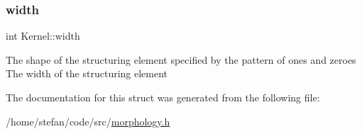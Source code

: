 \subsubsection{\texorpdfstring{width}{width}}
{\footnotesize\ttfamily int Kernel\+::width}

The shape of the structuring element specified by the pattern of ones and zeroes The width of the structuring element 

The documentation for this struct was generated from the following file\+:\begin{DoxyCompactItemize}
\item 
/home/stefan/code/src/\hyperlink{morphology_8h}{morphology.\+h}\end{DoxyCompactItemize}

